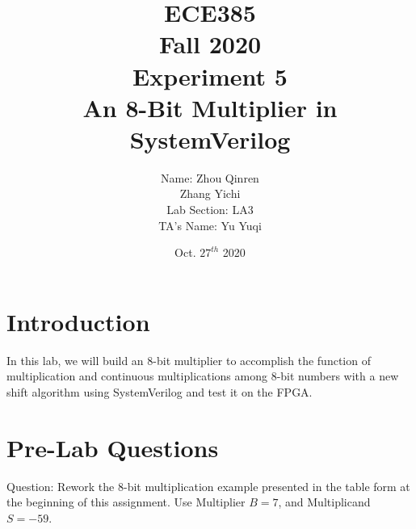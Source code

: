 \documentclass[12pt]{article}
\title{
    \textbf{\Huge ECE385} \\
    \huge Fall 2020 \\
    \huge Experiment 5 \\[120pt]
    \textbf{\Huge An 8-Bit Multiplier in SystemVerilog} \\[120pt]
    }
\author{
    \large Name: Zhou Qinren \\ 
            \quad\qquad Zhang Yichi \\
    \large Lab Section: LA3 \\
    \large TA's Name: Yu Yuqi
    }
\date{Oct. $27^{th}$ 2020}
\begin{document}
\setlength{\parindent}{0pt}
\maketitle
\newpage

\section{Introduction}
In this lab, we will build an 8-bit multiplier to accomplish the function of multiplication and continuous multiplications among 8-bit numbers with a new shift algorithm using SystemVerilog and test it on the FPGA.

\section{Pre-Lab Questions}
Question: Rework the 8-bit multiplication example presented in the table form at the beginning of this
assignment. Use Multiplier $B = 7$, and Multiplicand $S = -59$.
\end{document}

